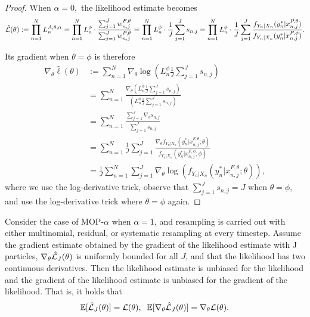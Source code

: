 \documentclass{article}
\begin{document}
\begin{proof}
    When $\alpha=0,$ the likelihood estimate becomes
\begin{equation}
    \hat{\mathcal{L}}(\theta) := \prod_{n=1}^N L_n^{A, \theta, \alpha} = \prod_{n=1}^N L_n^\phi \cdot \frac{\sum_{j=1}^J w_{n,j}^{F,\theta}}{\sum_{j=1}^J w_{n,j}^{P,\theta}} = \prod_{n=1}^N L_n^\phi \cdot \frac{1}{J}\sum_{j=1}^J s_{n,j} = \prod_{n=1}^N L_n^\phi \cdot \frac{1}{J}\sum_{j=1}^J \frac{f_{Y_n|X_n}(y_n^*|x_{n,j}^{P, \theta})}{f_{Y_n|X_n}(y_n^*|x_{n,j}^{P, \phi})}.
\end{equation}

Its gradient when $\theta=\phi$ is therefore 
\begin{align*}
    \nabla_\theta \hat{\ell}(\theta) &:= \sum_{n=1}^N \nabla_\theta \log\left(L_n^\phi \frac{1}{J} \sum_{j=1}^J s_{n,j}\right) \\
    &= \sum_{n=1}^N \frac{\nabla_\theta \left(L_n^\phi \frac{1}{J} \sum_{j=1}^J s_{n,j}\right)}{\left(L_n^\phi \frac{1}{J} \sum_{j=1}^J s_{n,j}\right)} \\
    &= \sum_{n=1}^N \frac{\sum_{j=1}^J \nabla_\theta s_{n,j}}{\sum_{j=1}^J s_{n,j}} \\
    &= \sum_{n=1}^N \frac{1}{J} \sum_{j=1}^J \frac{\nabla_\theta f_{Y_n|X_{n}}(y_n^*|x_{n,j}^{F, \theta}; \theta)}{f_{Y_n|X_{n}}(y_n^*|x_{n,j}^{F, \phi}; \phi)} \\
    &= \frac{1}{J} \sum_{n=1}^N \sum_{j=1}^J \nabla_\theta \log\left(f_{Y_n|X_{n}}(y_n^*|x_{n,j}^{F, \theta}; \theta)\right),
\end{align*}
where we use the log-derivative trick, observe that $\sum_{j=1}^J s_{n,j} = J$ when $\theta=\phi$, and use the log-derivative trick where $\theta=\phi$ again. 
\end{proof}


\begin{conj}
    Consider the case of MOP-$\alpha$ when $\alpha=1$, and resampling is carried out with either multinomial, residual, or systematic resampling at every timestep. Assume the gradient estimate obtained by the gradient of the likelihood estimate with J particles, $\nabla_\theta \hat{\mathcal{L}}_J(\theta)$ is uniformly bounded for all $J$, and that the likelihood has two continuous derivatives. Then the likelihood estimate is unbiased for the likelihood and the gradient of the likelihood estimate is unbiased for the gradient of the likelihood. That is, it holds that
    $$\mathbb{E}[\hat{\mathcal{L}}_J(\theta)] = \mathcal{L}(\theta),\;\; \mathbb{E}[\nabla_\theta \hat{\mathcal{L}}_J(\theta)] = \nabla_\theta \mathcal{L}(\theta).$$
\end{conj}
\end{document}
